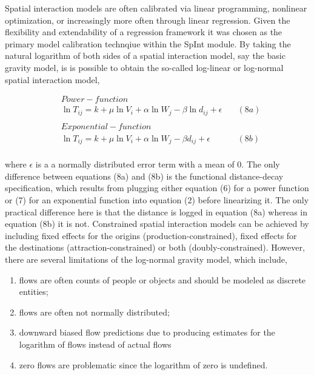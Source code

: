 \documentclass[11pt]{article}
\begin{document}
    Spatial interaction models are often calibrated via linear programming,
nonlinear optimization, or increasingly more often through linear
regression. Given the flexibility and extendability of a regression
framework it was chosen as the primary model calibration technqiue
within the SpInt module. By taking the natural logarithm of both sides
of a spatial interaction model, say the basic gravity model, is is
possible to obtain the so-called log-linear or log-normal spatial
interaction model,

\[
\begin{align}
& Power-function \\
&\ln{T_{ij}} = k + \mu \ln{V_{i}} + \alpha \ln{W_{j}} - \beta \ln{d_{ij}} + \epsilon \quad &(8a) \\
\\
& Exponential-function \\
&\ln{T_{ij}} = k + \mu \ln{V_{i}} + \alpha \ln{W_{j}} - \beta {d_{ij}} + \epsilon \quad &(8b) \\
\end{align}
\]

where \(\epsilon\) is a a normally distributed error term with a mean of
0. The only difference between equations (8a) and (8b) is the functional
distance-decay specification, which results from plugging either
equation (6) for a power function or (7) for an exponential function
into equation (2) before linearizing it. The only practical difference
here is that the distance is logged in equation (8a) whereas in equation
(8b) it is not. Constrained spatial interaction models can be achieved
by including fixed effects for the origins (production-constrained),
fixed effects for the destinations (attraction-constrained) or both
(doubly-constrained). However, there are several limitations of the
log-normal gravity model, which include,

\begin{enumerate}
\def\labelenumi{\arabic{enumi}.}
\itemsep1pt\parskip0pt
\item
  flows are often counts of people or objects and should be modeled as
  discrete entities;
\item
  flows are often not normally distributed;
\item
  downward biased flow predictions due to producing estimates for the
  logarithm of flows instead of actual flows
\item
  zero flows are problematic since the logarithm of zero is undefined.
\end{enumerate}
\end{document}

